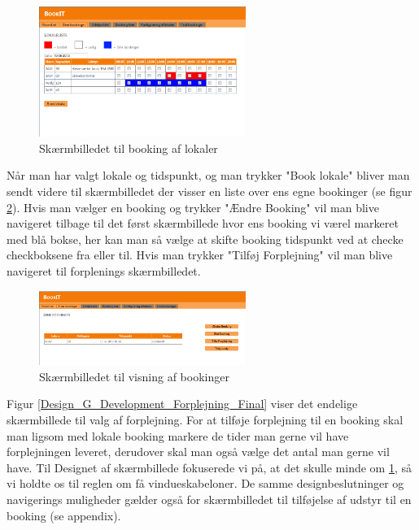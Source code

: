 \begin{figure}[h!]
  \centering
    \includegraphics[width=0.6\textwidth]{Appendix/GUI-Prototype/DigitalMockup/GridEksempel}
  \caption{Skærmbilledet til booking af lokaler}
\label{Design_G_Development_FinalGrid}
\end{figure}

Når man har valgt lokale og tidspunkt, og man trykker "Book lokale" bliver man sendt videre til skærmbilledet der visser en liste over ens egne bookinger (se figur \ref{Design_G_Development_YourBookings_Final}). Hvis man vælger en booking og trykker "Ændre Booking" vil man blive navigeret tilbage til det først skærmbillede hvor ens booking vi værel markeret med blå bokse, her kan man så vælge at skifte booking tidspunkt ved at checke checkboksene fra eller til. Hvis man trykker "Tilføj Forplejning" vil man blive navigeret til forplenings skærmbilledet.

\begin{figure}[h!]
  \centering
    \includegraphics[width=0.6\textwidth]{Appendix/GUI-Prototype/DigitalMockup/DineBookinger}
  \caption{Skærmbilledet til visning af bookinger}
\label{Design_G_Development_YourBookings_Final}
\end{figure} 

Figur \ref{Design_G_Development_Forplejning_Final} viser det endelige skærmbillede til valg af forplejning. For at tilføje forplejning til en booking skal man ligsom med lokale booking markere de tider man gerne vil have forplejningen leveret, derudover skal man også vælge det antal man gerne vil have.
Til Designet af  skærmbillede fokuserede vi på, at det skulle minde om \ref{Design_G_Development_FinalGrid}, så vi holdte os til reglen om få vindueskabeloner. De samme designbeslutninger og navigerings muligheder gælder også for skærmbilledet til tilføjelse af udstyr til en booking (se appendix).

